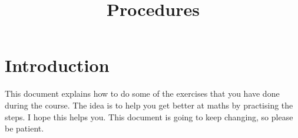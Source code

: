 \documentclass{tareaClass}
\title{ Procedures }
\begin{document}
\rhead{\today}

\maketitle

\section{Introduction}

This document explains how to do some of the exercises that you have done during the course.
The idea is to help you get better at maths by practising the steps.
I hope this helps you.
This document is going to keep changing, so please be patient.


%
%
%
%
%


%
\end{document}

